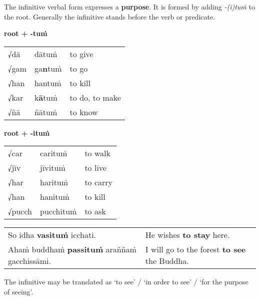 \documentclass[11pt,oneside]{memoir}
\begin{document}
The infinitive verbal form expresses a \textbf{purpose}.
It is formed by adding \emph{-(i)tuṁ} to the root.
Generally the infinitive stands before the verb or predicate.

\begin{multicols}{2}

\textbf{root + -tuṁ}

\begin{center}
\begin{tabular}{lll}
√dā & dātuṁ & to give\\[0pt]
√gam & ga\textbf{n}tuṁ & to go\\[0pt]
√han & hantuṁ & to kill\\[0pt]
√kar & k\textbf{ā}tuṁ & to do, to make\\[0pt]
√ñā & ñātuṁ & to know\\[0pt]
\end{tabular}
\end{center}

\columnbreak

\textbf{root + -ituṁ}

\begin{center}
\begin{tabular}{lll}
√car & carituṁ & to walk\\[0pt]
√jīv & jīvituṁ & to live\\[0pt]
√har & harituṁ & to carry\\[0pt]
√han & hanituṁ & to kill\\[0pt]
√pucch & pucchituṁ & to ask\\[0pt]
\end{tabular}
\end{center}

\end{multicols}

\begin{center}
\begin{tabular}{ll}
So idha \textbf{vasituṁ} icchati. & He wishes \textbf{to stay} here.\\[0pt]
Ahaṁ buddhaṁ \textbf{passituṁ} araññaṁ gacchissāmi. & I will go to the forest \textbf{to see} the Buddha.\\[0pt]
\end{tabular}
\end{center}

The infinitive may be translated as `to see' / `in order to see' / `for the purpose of seeing'.

\renewcommand{\arraystretch}{1.8}
\end{document}
